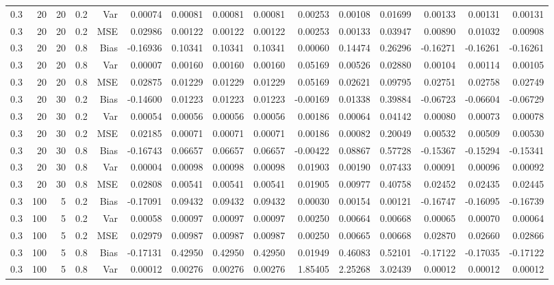 \begin{table}[!htbp]
\begin{tabular}{lrrrrrrrrrrrrrr}
0.3 &  20 & 20 & 0.2 & Var & 0.00074 & 0.00081 & 0.00081 & 0.00081 & 0.00253 & 0.00108 & 0.01699 & 0.00133 & 0.00131 & 0.00131 \\
0.3 &  20 & 20 & 0.2 & MSE & 0.02986 & 0.00122 & 0.00122 & 0.00122 & 0.00253 & 0.00133 & 0.03947 & 0.00890 & 0.01032 & 0.00908 \\
0.3 &  20 & 20 & 0.8 & Bias & -0.16936 & 0.10341 & 0.10341 & 0.10341 & 0.00060 & 0.14474 & 0.26296 & -0.16271 & -0.16261 & -0.16261 \\
0.3 &  20 & 20 & 0.8 & Var & 0.00007 & 0.00160 & 0.00160 & 0.00160 & 0.05169 & 0.00526 & 0.02880 & 0.00104 & 0.00114 & 0.00105 \\
0.3 &  20 & 20 & 0.8 & MSE & 0.02875 & 0.01229 & 0.01229 & 0.01229 & 0.05169 & 0.02621 & 0.09795 & 0.02751 & 0.02758 & 0.02749 \\
0.3 &  20 & 30 & 0.2 & Bias & -0.14600 & 0.01223 & 0.01223 & 0.01223 & -0.00169 & 0.01338 & 0.39884 & -0.06723 & -0.06604 & -0.06729 \\
0.3 &  20 & 30 & 0.2 & Var & 0.00054 & 0.00056 & 0.00056 & 0.00056 & 0.00186 & 0.00064 & 0.04142 & 0.00080 & 0.00073 & 0.00078 \\
0.3 &  20 & 30 & 0.2 & MSE & 0.02185 & 0.00071 & 0.00071 & 0.00071 & 0.00186 & 0.00082 & 0.20049 & 0.00532 & 0.00509 & 0.00530 \\
0.3 &  20 & 30 & 0.8 & Bias & -0.16743 & 0.06657 & 0.06657 & 0.06657 & -0.00422 & 0.08867 & 0.57728 & -0.15367 & -0.15294 & -0.15341 \\
0.3 &  20 & 30 & 0.8 & Var & 0.00004 & 0.00098 & 0.00098 & 0.00098 & 0.01903 & 0.00190 & 0.07433 & 0.00091 & 0.00096 & 0.00092 \\
0.3 &  20 & 30 & 0.8 & MSE & 0.02808 & 0.00541 & 0.00541 & 0.00541 & 0.01905 & 0.00977 & 0.40758 & 0.02452 & 0.02435 & 0.02445 \\
0.3 & 100 &  5 & 0.2 & Bias & -0.17091 & 0.09432 & 0.09432 & 0.09432 & 0.00030 & 0.00154 & 0.00121 & -0.16747 & -0.16095 & -0.16739 \\
0.3 & 100 &  5 & 0.2 & Var & 0.00058 & 0.00097 & 0.00097 & 0.00097 & 0.00250 & 0.00664 & 0.00668 & 0.00065 & 0.00070 & 0.00064 \\
0.3 & 100 &  5 & 0.2 & MSE & 0.02979 & 0.00987 & 0.00987 & 0.00987 & 0.00250 & 0.00665 & 0.00668 & 0.02870 & 0.02660 & 0.02866 \\
0.3 & 100 &  5 & 0.8 & Bias & -0.17131 & 0.42950 & 0.42950 & 0.42950 & 0.01949 & 0.46083 & 0.52101 & -0.17122 & -0.17035 & -0.17122 \\
0.3 & 100 &  5 & 0.8 & Var & 0.00012 & 0.00276 & 0.00276 & 0.00276 & 1.85405 & 2.25268 & 3.02439 & 0.00012 & 0.00012 & 0.00012 \\

\end{tabular}
\end{table}
